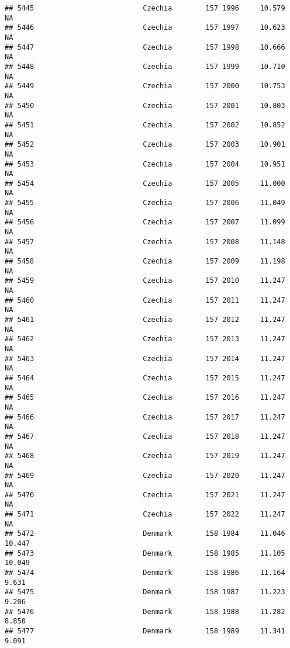\documentclass[
]{article}
\begin{document}
\begin{verbatim}
## 5445                          Czechia        157 1996     10.579         NA
## 5446                          Czechia        157 1997     10.623         NA
## 5447                          Czechia        157 1998     10.666         NA
## 5448                          Czechia        157 1999     10.710         NA
## 5449                          Czechia        157 2000     10.753         NA
## 5450                          Czechia        157 2001     10.803         NA
## 5451                          Czechia        157 2002     10.852         NA
## 5452                          Czechia        157 2003     10.901         NA
## 5453                          Czechia        157 2004     10.951         NA
## 5454                          Czechia        157 2005     11.000         NA
## 5455                          Czechia        157 2006     11.049         NA
## 5456                          Czechia        157 2007     11.099         NA
## 5457                          Czechia        157 2008     11.148         NA
## 5458                          Czechia        157 2009     11.198         NA
## 5459                          Czechia        157 2010     11.247         NA
## 5460                          Czechia        157 2011     11.247         NA
## 5461                          Czechia        157 2012     11.247         NA
## 5462                          Czechia        157 2013     11.247         NA
## 5463                          Czechia        157 2014     11.247         NA
## 5464                          Czechia        157 2015     11.247         NA
## 5465                          Czechia        157 2016     11.247         NA
## 5466                          Czechia        157 2017     11.247         NA
## 5467                          Czechia        157 2018     11.247         NA
## 5468                          Czechia        157 2019     11.247         NA
## 5469                          Czechia        157 2020     11.247         NA
## 5470                          Czechia        157 2021     11.247         NA
## 5471                          Czechia        157 2022     11.247         NA
## 5472                          Denmark        158 1984     11.046     10.447
## 5473                          Denmark        158 1985     11.105     10.049
## 5474                          Denmark        158 1986     11.164      9.631
## 5475                          Denmark        158 1987     11.223      9.206
## 5476                          Denmark        158 1988     11.282      8.850
## 5477                          Denmark        158 1989     11.341      9.091

\end{verbatim}
\end{document}
